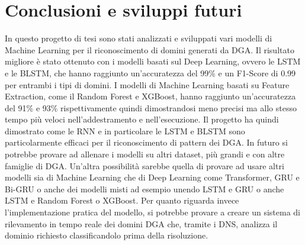 \documentclass[12pt,a4paper,openright,twoside]{book}
\begin{document}
\chapter{Conclusioni e sviluppi futuri}
In questo progetto di tesi sono stati analizzati e sviluppati
vari modelli di Machine Learning per il riconoscimento
di domini generati da DGA.
Il risultato migliore è stato ottenuto con i modelli basati sul 
Deep Learning, ovvero le LSTM e le BLSTM,
che hanno raggiunto un'accuratezza del 99\% e un F1-Score
di 0.99 per entrambi i tipi di domini.
I modelli di Machine Learning basati su Feature Extraction, come il Random Forest e XGBoost,
hanno raggiunto un'accuratezza del 91\% e 93\% rispettivamente
quindi dimostrandosi meno precisi ma allo stesso tempo
più veloci nell'addestramento e nell'esecuzione.
Il progetto ha quindi dimostrato come le RNN e in particolare le LSTM e BLSTM
sono particolarmente efficaci per il riconoscimento di pattern dei DGA. \hfill \break
In futuro si potrebbe provare ad allenare i modelli su altri dataset,
più grandi e con altre famiglie di DGA.
Un'altra possibilità sarebbe quella di provare ad usare altri modelli
sia di Machine Learning che di Deep Learning come Transformer, GRU e Bi-GRU o anche dei modelli
misti ad esempio unendo LSTM e GRU o anche LSTM e Random Forest o XGBoost.
Per quanto riguarda invece l'implementazione pratica del modello, si potrebbe provare a creare un sistema
di rilevamento in tempo reale dei domini DGA che, tramite i DNS, analizza il dominio richiesto
classificandolo prima della risoluzione.





% 



\end{document}
